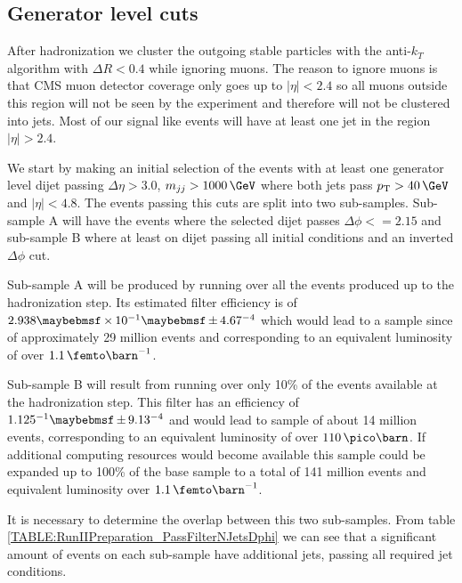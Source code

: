 \subsection{Generator level cuts}
\label{SUBSECTION:RunIIPreparation_GeneratorLevelCuts}


After hadronization we cluster the outgoing stable particles with the anti-$k_T$ algorithm with $\Delta R<0.4$ while ignoring muons. The reason to ignore muons is that \gls{CMS} muon detector coverage only goes up to $|\eta|<2.4$ so all muons outside this region will not be seen by the experiment and therefore will not be clustered into jets. Most of our signal like events will have at least one jet in the region $|\eta|>2.4$. 

We start by making an initial selection of the events with at least one generator level dijet passing $\Delta\eta > 3.0$, $m_{jj} > 1000\,\GeV$ where both jets pass $\pt > 40\,\GeV$ and $|\eta|<4.8$. The events passing this cuts are split into two sub-samples. Sub-sample A will have the events where the selected dijet passes $\Delta\phi<=2.15$ and sub-sample B where at least on dijet passing all initial conditions and an inverted $\Delta\phi$ cut.



Sub-sample A will be produced by running over all the events produced up to the hadronization step. Its estimated filter efficiency is of $2.938 \times 10^{-1} \pm 4.67 \time 10^{-4}$ which would lead to a sample since of approximately 29 million events and corresponding to an equivalent luminosity of over $1.1\,\femto\barn^{-1}$.

Sub-sample B will result from running over only 10\% of the events available at the hadronization step. This filter has an efficiency of $1.125 \time 10^{-1} \pm 9.13 \time 10^{-4}$  and would lead to sample of about 14 million events, corresponding to an equivalent luminosity of over $110\,\pico\barn$. If additional computing resources would become available this sample could be expanded up to 100\% of the base sample to a total of 141 million events and equivalent luminosity over $1.1\,\femto\barn^{-1}$.

It is necessary to determine the overlap between this two sub-samples. From table \ref{TABLE:RunIIPreparation_PassFilterNJetsDphi} we can see that a significant amount of events on each sub-sample have additional jets, passing all required jet conditions. 

